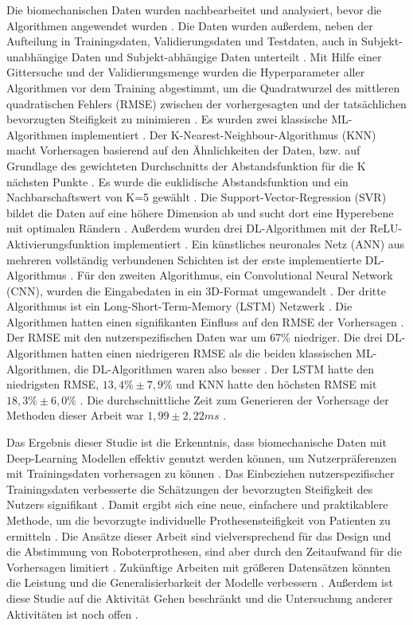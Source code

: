 Die biomechanischen Daten wurden nachbearbeitet und analysiert, bevor die Algorithmen angewendet wurden \cite{Shetty.2022}. Die Daten wurden außerdem, neben der Aufteilung in Trainingsdaten, Validierungsdaten und Testdaten, auch in Subjekt-unabhängige Daten und Subjekt-abhängige Daten unterteilt \cite{Shetty.2022}. Mit Hilfe einer Gittersuche und der Validierungsmenge wurden die Hyperparameter aller Algorithmen vor dem Training abgestimmt, um die Quadratwurzel des mittleren quadratischen Fehlers (RMSE) zwischen der vorhergesagten und der tatsächlichen bevorzugten Steifigkeit zu minimieren \cite{Shetty.2022}.
Es wurden zwei klassische ML-Algorithmen implementiert \cite{Shetty.2022}. Der K-Nearest-Neighbour-Algorithmus (KNN) macht Vorhersagen basierend auf den Ähnlichkeiten der Daten, bzw. auf Grundlage des gewichteten Durchschnitts der Abstandsfunktion für die K nächsten Punkte \cite{Shetty.2022}. Es wurde die euklidische Abstandsfunktion und ein Nachbarschaftswert von K=5 gewählt \cite{Shetty.2022}. Die Support-Vector-Regression (SVR) bildet die Daten auf eine höhere Dimension ab und sucht dort eine Hyperebene mit optimalen Rändern \cite{Shetty.2022}. Außerdem wurden drei DL-Algorithmen mit der ReLU-Aktivierungsfunktion implementiert \cite{Shetty.2022}. Ein künstliches neuronales Netz (ANN) aus mehreren vollständig verbundenen Schichten ist der erste implementierte DL-Algorithmus \cite{Shetty.2022}. Für den zweiten Algorithmus, ein Convolutional Neural Network (CNN), wurden die Eingabedaten in ein 3D-Format umgewandelt \cite{Shetty.2022}. Der dritte Algorithmus ist ein Long-Short-Term-Memory (LSTM) Netzwerk \cite{Shetty.2022}.
Die Algorithmen hatten einen signifikanten Einfluss auf den RMSE der Vorhersagen \cite{Shetty.2022}. Der RMSE mit den nutzerspezifischen Daten war um 67\% niedriger. Die drei DL-Algorithmen hatten einen niedrigeren RMSE als die beiden klassischen ML-Algorithmen, die DL-Algorithmen waren also besser \cite{Shetty.2022}. Der LSTM hatte den niedrigsten RMSE, $13,4\% \pm7,9\%$ und KNN hatte den höchsten RMSE mit $18,3\% \pm6,0\%$ \cite{Shetty.2022}. Die durchschnittliche Zeit zum Generieren der Vorhersage der Methoden dieser Arbeit war $1,99 \pm 2,22 ms$ \cite{Shetty.2022}.

Das Ergebnis dieser Studie ist die Erkenntnis, dass biomechanische Daten mit Deep-Learning Modellen effektiv genutzt werden können, um Nutzerpräferenzen mit Trainingsdaten vorhersagen zu können \cite{Shetty.2022}. Das Einbeziehen nutzerspezifischer Trainingsdaten verbesserte die Schätzungen der bevorzugten Steifigkeit des Nutzers signifikant \cite{Shetty.2022}. Damit ergibt sich eine neue, einfachere und praktikablere Methode, um die bevorzugte individuelle Prothesensteifigkeit von Patienten zu ermitteln \cite{Shetty.2022}. Die Ansätze dieser Arbeit sind vielversprechend für das Design und die Abstimmung von Roboterprothesen, sind aber durch den Zeitaufwand für die Vorhersagen limitiert \cite{Shetty.2022}. Zukünftige Arbeiten mit größeren Datensätzen könnten die Leistung und die Generalisierbarkeit der Modelle verbessern \cite{Shetty.2022}. Außerdem ist diese Studie auf die Aktivität Gehen beschränkt und die Untersuchung anderer Aktivitäten ist noch offen \cite{Shetty.2022}.


